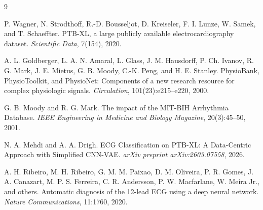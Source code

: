 \documentclass[11pt,a4paper]{article}
\begin{document}
\newpage
\begin{thebibliography}{9}

P. Wagner, N. Strodthoff, R.-D. Bousseljot, D. Kreiseler, F. I. Lunze, W. Samek, and T. Schaeffter.
\newblock PTB-XL, a large publicly available electrocardiography dataset.
\newblock \emph{Scientific Data}, 7(154), 2020.

A. L. Goldberger, L. A. N. Amaral, L. Glass, J. M. Hausdorff, P. Ch. Ivanov, R. G. Mark, J. E. Mietus, G. B. Moody, C.-K. Peng, and H. E. Stanley.
\newblock PhysioBank, PhysioToolkit, and PhysioNet: Components of a new research resource for complex physiologic signals.
\newblock \emph{Circulation}, 101(23):e215--e220, 2000.

G. B. Moody and R. G. Mark.
\newblock The impact of the MIT-BIH Arrhythmia Database.
\newblock \emph{IEEE Engineering in Medicine and Biology Magazine}, 20(3):45--50, 2001.

N. A. Mehdi and A. A. Drigh.
\newblock ECG Classification on PTB-XL: A Data-Centric Approach with Simplified CNN-VAE.
\newblock \emph{arXiv preprint arXiv:2603.07558}, 2026.

A. H. Ribeiro, M. H. Ribeiro, G. M. M. Paixao, D. M. Oliveira, P. R. Gomes, J. A. Canazart, M. P. S. Ferreira, C. R. Andersson, P. W. Macfarlane, W. Meira Jr., and others.
\newblock Automatic diagnosis of the 12-lead ECG using a deep neural network.
\newblock \emph{Nature Communications}, 11:1760, 2020.

\end{thebibliography}
\end{document}
